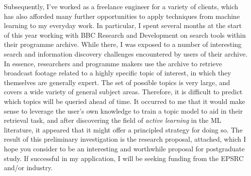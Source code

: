 \documentclass[a4paper, 11pt]{article}
\begin{document}
Subsequently, I've worked as a freelance engineer for a variety of clients, which has also afforded many further opportunities to apply techniques from machine learning to my everyday work. In particular, I spent several months at the start of this year working with BBC Research and Development on search tools within their programme archive. While there, I was exposed to a number of interesting search and information discovery challenges encountered by users of their archive. In essence, researchers and programme makers use the archive to retrieve broadcast footage related to a highly specific topic of interest, in which they themselves are generally expert. The set of possible topics is very large, and covers a wide variety of general subject areas. Therefore, it is difficult to predict which topics will be queried ahead of time. It occurred to me that it would make sense to leverage the user's own knowledge to train a topic model to aid in their retrieval task, and after discovering the field of \textit{active learning} in the ML literature, it appeared that it might offer a principled strategy for doing so. The result of this preliminary investigation is the research proposal, attached, which I hope you consider to be an interesting and worthwhile proposal for postgraduate study. If successful in my application, I will be seeking funding from the EPSRC and/or industry.
\end{document}
